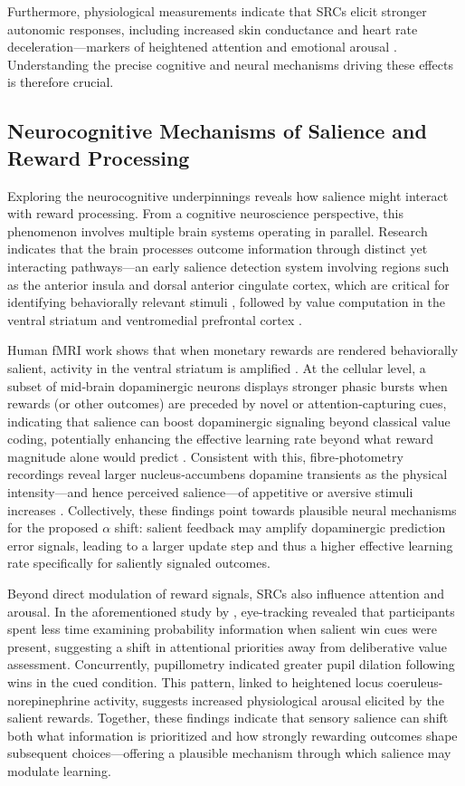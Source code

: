 Furthermore, physiological measurements indicate that SRCs elicit stronger autonomic responses, including increased skin conductance and heart rate deceleration—markers of heightened attention and emotional arousal \citep{dixon2014, detez2019}. Understanding the precise cognitive and neural mechanisms driving these effects is therefore crucial.

\subsection{Neurocognitive Mechanisms of Salience and Reward Processing}

Exploring the neurocognitive underpinnings reveals how salience might interact with reward processing. From a cognitive neuroscience perspective, this phenomenon involves multiple brain systems operating in parallel. Research indicates that the brain processes outcome information through distinct yet interacting pathways—an early salience detection system involving regions such as the anterior insula and dorsal anterior cingulate cortex, which are critical for identifying behaviorally relevant stimuli \citep{seeley2007}, followed by value computation in the ventral striatum and ventromedial prefrontal cortex \citep{bartra2013}.

Human fMRI work shows that when monetary rewards are rendered behaviorally salient, activity in the ventral striatum is amplified \citep{zink2004}. At the cellular level, a subset of mid‑brain dopaminergic neurons displays stronger phasic bursts when rewards (or other outcomes) are preceded by novel or attention‑capturing cues, indicating that salience can boost dopaminergic signaling beyond classical value coding, potentially enhancing the effective learning rate beyond what reward magnitude alone would predict \citep{bromberg2010}. Consistent with this, fibre‑photometry recordings reveal larger nucleus‑accumbens dopamine transients as the physical intensity—and hence perceived salience—of appetitive or aversive stimuli increases \citep{kutlu2021}. Collectively, these findings point towards plausible neural mechanisms for the proposed $\alpha$ shift: salient feedback may amplify dopaminergic prediction error signals, leading to a larger update step and thus a higher effective learning rate specifically for saliently signaled outcomes.

Beyond direct modulation of reward signals, SRCs also influence attention and arousal. In the aforementioned study by \citet{cherkasova2018}, eye-tracking revealed that participants spent less time examining probability information when salient win cues were present, suggesting a shift in attentional priorities away from deliberative value assessment. Concurrently, pupillometry indicated greater pupil dilation following wins in the cued condition. This pattern, linked to heightened locus coeruleus-norepinephrine activity, suggests increased physiological arousal elicited by the salient rewards. Together, these findings indicate that sensory salience can shift both what information is prioritized and how strongly rewarding outcomes shape subsequent choices—offering a plausible mechanism through which salience may modulate learning.

